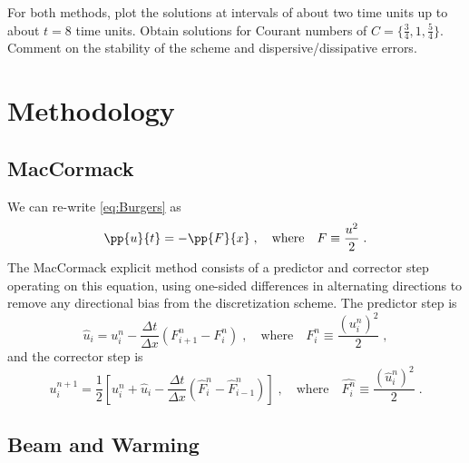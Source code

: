 \documentclass[11pt]{article}
\begin{document}
For both methods, plot the solutions at intervals of about two time units up to about $t=8$ time units. Obtain solutions for Courant numbers of $C = \{\tfrac{3}{4}, 1, \tfrac{5}{4}\}$. Comment on the stability of the scheme and dispersive/dissipative errors.

\section{Methodology} %

\subsection{MacCormack}

We can re-write \eqref{eq:Burgers} as
\begin{equation}
\pp{u}{t} = - \pp{F}{x}
\;, \quad
\text{where}
\quad
F \equiv \frac{u^2}{2}
\;.
\end{equation}
The MacCormack explicit method consists of a predictor and corrector step operating on this equation, using one-sided differences in alternating directions to remove any directional bias from the discretization scheme. The predictor step is
\begin{equation}
\hat{u}_i = u_i^n - \frac{\Delta t}{\Delta x} ( F_{i+1}^n - F_{i}^n )
\;, \quad
\text{where}
\quad
F_i^n \equiv \frac{(u_i^n)^2}{2}
\;,
\end{equation}
and the corrector step is
\begin{equation}
u_i^{n+1} = \frac{1}{2} \left[ u_i^n + \hat{u}_i - \frac{\Delta t}{\Delta x} ( \hat{F}_{i}^n - \hat{F}_{i-1}^n ) \right]
\;, \quad
\text{where}
\quad
\hat{F_i^n} \equiv \frac{(\hat{u}_i^n)^2}{2}
\;.
\end{equation}

\subsection{Beam and Warming}
\end{document}
